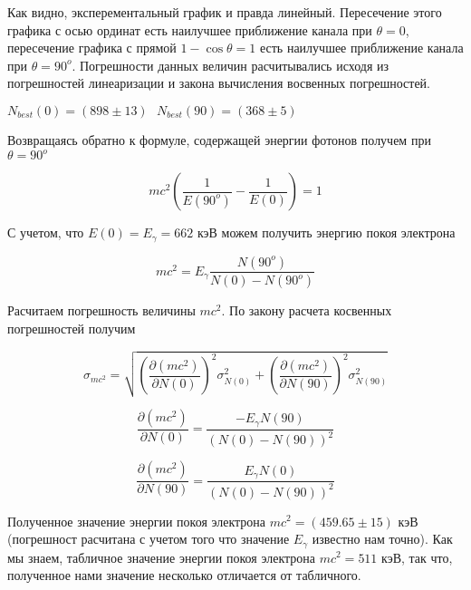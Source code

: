     Как видно, эксперементальный график и правда линейный. Пересечение этого графика с осью ординат
    есть наилучшее приближение канала при $\theta = 0$, пересечение графика с прямой $1 - \cos \theta = 1$
    есть наилучшее приближение канала при $\theta = 90^o$. Погрешности данных величин расчитывались исходя из
    погрешностей линеаризации и закона вычисления восвенных погрешностей.

    \begin{center}
        $N_{best}(0) = (898 \pm 13) ~~~ N_{best}(90) = (368 \pm 5)$
    \end{center}

    Возвращаясь обратно к формуле, содержащей энергии фотонов получем при $\theta = 90^o$

    \begin{equation}
        mc^2 \left (\frac{1}{E(90^o)} - \frac{1}{E(0)} \right) = 1
    \end{equation}

    С учетом, что $E(0) = E_{\gamma} = 662$ кэВ можем получить энергию покоя электрона

    \begin{equation}
        mc^2 = E_{\gamma} \frac{N(90^o)}{N(0) - N(90^o)}
    \end{equation}

    Расчитаем погрешность величины $mc^2$. По закону расчета косвенных погрешностей получим

    \begin{equation}
        \sigma_{mc^2} = \sqrt{\left(\frac{\partial (mc^2)}{\partial N(0)} \right)^2 \sigma_{N(0)}^2 + \left(\frac{\partial (mc^2)}{\partial N(90)} \right)^2 \sigma_{N(90)}^2}
    \end{equation}

    \begin{equation}
        \frac{\partial (mc^2)}{\partial N(0)} = \frac{-E_{\gamma} N(90)}{(N(0) - N(90))^2}
    \end{equation}

    \begin{equation}
        \frac{\partial (mc^2)}{\partial N(90)} = \frac{E_{\gamma} N(0)}{(N(0) - N(90))^2}
    \end{equation}

    Полученное значение энергии покоя электрона $mc^2 = (459.65 \pm 15)$ кэВ (погрешност расчитана с учетом того
    что значение $E_{\gamma}$ известно нам точно). Как мы знаем, табличное значение
    энергии покоя электрона $mc^2 = 511$ кэВ, так что, полученное нами значение несколько отличается от табличного.

